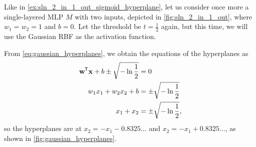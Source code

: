 \begin{example}
    \label{ex:sln_2_in_1_out_gaussian_hyperplanes}
    Like in \ref{ex:sln_2_in_1_out_sigmoid_hyperplane}, let us consider once more a single-layered MLP $M$ with two inputs, depicted in \ref{fig:sln_2_in_1_out}, where $w_1=w_2=1$ and $b=0$. 
    Let the threshold be $t=\frac{1}{2}$ again, but this time, we will use the Gaussian RBF as the activation function.

    From \ref{eq:gaussian_hyperplanes}, we obtain the equations of the hyperplanes as
    \begin{align*}
        \mathbf{w}^{\mkern-1.5mu\mathsf{T}} \mathbf{x} + b \pm \sqrt{-\ln{\frac{1}{2}}} &= 0 \\
        w_1 x_1 + w_2 x_2 + b &=  \pm \sqrt{-\ln{\frac{1}{2}}} \\
        x_1 + x_2 &= \pm \sqrt{-\ln{\frac{1}{2}}},
    \end{align*}
    so the hyperplanes are at $x_2 = -x_1 - 0.8325\dots$ and $x_2 = -x_1 + 0.8325\dots$, as shown in \ref{fig:gaussian_hyperplanes}.


\end{example}
